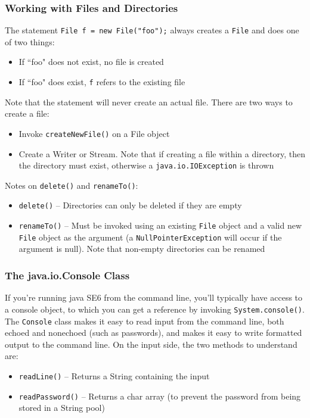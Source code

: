 \subsubsection{Working with Files and Directories}
The statement \verb#File f = new File("foo");# always creates a \verb#File# and 
does one of two things:
\begin{itemize}
    \item If ``foo" does not exist, no file is created
    \item If ``foo" does exist, \verb#f# refers to the existing file
\end{itemize}
Note that the statement will never create an actual file. There are two ways to 
create a file:
\begin{itemize}
    \item Invoke \verb#createNewFile()# on a File object
    \item Create a Writer or Stream. Note that if creating a file within a 
    directory, then the directory must exist, otherwise a 
    \verb#java.io.IOException# is thrown
\end{itemize}
Notes on \verb#delete()# and \verb#renameTo()#:
\begin{itemize}
    \item \verb#delete()# -- Directories can only be deleted if they are empty
    \item \verb#renameTo()# -- Must be invoked using an existing \verb#File# 
    object and a valid new \verb#File# object as the argument (a 
    \verb#NullPointerException# will occur if the argument is null). Note that 
    non-empty directories can be renamed
\end{itemize}

\subsubsection{The java.io.Console Class}
If you're running java SE6 from the command line, you'll typically have access 
to a console object, to which you can get a reference by invoking 
\verb#System.console()#. The \verb#Console# class makes it easy to read input 
from the command line, both echoed and nonechoed (such as passwords), and makes 
it easy to write formatted output to the command line. On the input side, the 
two methods to understand are:
\begin{itemize}
    \item \verb#readLine()# -- Returns a String containing the input
    \item \verb#readPassword()# -- Returns a char array (to prevent the 
    password from being stored in a String pool)
\end{itemize}

